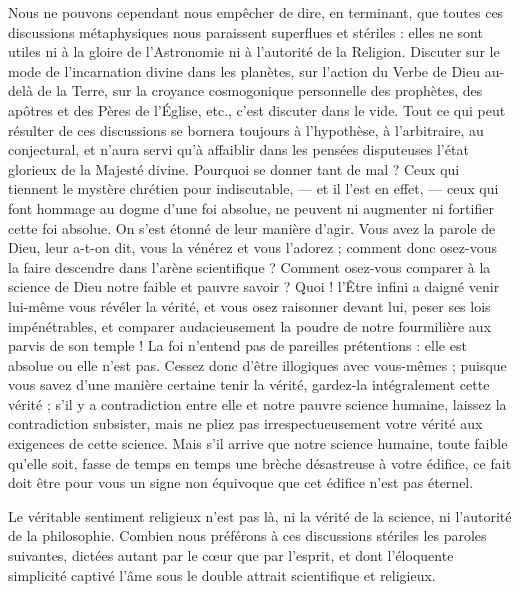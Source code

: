 \documentclass[a4paper, 11pt, oneside]{article}
\begin{document}
Nous ne pouvons cependant nous empêcher de dire, en terminant, que toutes ces discussions métaphysiques nous paraissent superflues et stériles : elles ne sont utiles ni à la gloire de l'Astronomie ni à l'autorité de la Religion. Discuter sur le mode de l'incarnation divine dans les planètes, sur l'action du Verbe de Dieu au-delà de la Terre, sur la croyance cosmogonique personnelle des prophètes, des apôtres et des Pères de l'Église, etc., c'est discuter dans le vide. Tout ce qui peut résulter de ces discussions se bornera toujours à l'hypothèse, à l'arbitraire, au conjectural, et n'aura servi qu'à affaiblir dans les pensées disputeuses l'état glorieux de la Majesté divine. Pourquoi se donner tant de mal ? Ceux qui tiennent le mystère chrétien pour indiscutable, --- et il l'est en effet, --- ceux qui font hommage au dogme d'une foi absolue, ne peuvent ni augmenter ni fortifier cette foi absolue. On s'est étonné de leur manière d'agir. Vous avez la parole de Dieu, leur a-t-on dit, vous la vénérez et vous l'adorez ; comment donc osez-vous la faire descendre dans l'arène scientifique ? Comment osez-vous comparer à la science de Dieu notre faible et pauvre savoir ? Quoi ! l'Être infini a daigné venir lui-même vous révéler la vérité, et vous osez raisonner devant lui, peser ses lois impénétrables, et comparer audacieusement la poudre de notre fourmilière aux parvis de son temple ! La foi n'entend pas de pareilles prétentions : elle est absolue ou elle n'est pas. Cessez donc d'être illogiques avec vous-mêmes ; puisque vous savez d'une manière certaine tenir la vérité, gardez-la intégralement cette vérité ; s'il y a contradiction entre elle et notre pauvre science humaine, laissez la contradiction subsister, mais ne pliez pas irrespectueusement votre vérité aux exigences de cette science. Mais s'il arrive que notre science humaine, toute faible qu'elle soit, fasse de temps en temps une brèche désastreuse à votre édifice, ce fait doit être pour vous un signe non équivoque que cet édifice n'est pas éternel.

Le véritable sentiment religieux n'est pas là, ni la vérité de la science, ni l'autorité de la philosophie. Combien nous préférons à ces discussions stériles les paroles suivantes, dictées autant par le cœur que par l'esprit, et dont l'éloquente simplicité captivé l'âme sous le double attrait scientifique et religieux.
\end{document}
